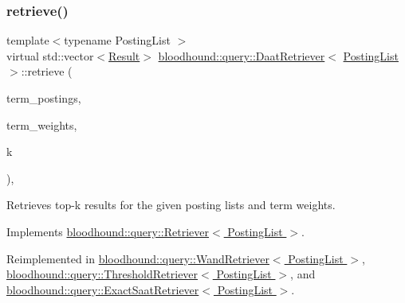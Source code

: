 \subsubsection{\texorpdfstring{retrieve()}{retrieve()}}
{\footnotesize\ttfamily template$<$typename Posting\+List $>$ \\
virtual std\+::vector$<$\hyperlink{structbloodhound_1_1query_1_1Result}{Result}$>$ \hyperlink{classbloodhound_1_1query_1_1DaatRetriever}{bloodhound\+::query\+::\+Daat\+Retriever}$<$ \hyperlink{classbloodhound_1_1PostingList}{Posting\+List} $>$\+::retrieve (\begin{DoxyParamCaption}\item[{const std\+::vector$<$ \hyperlink{classbloodhound_1_1PostingList}{Posting\+List} $>$ \&}]{term\+\_\+postings,  }\item[{const std\+::vector$<$ \hyperlink{structbloodhound_1_1Score}{Score} $>$ \&}]{term\+\_\+weights,  }\item[{std\+::size\+\_\+t}]{k }\end{DoxyParamCaption})\hspace{0.3cm}{\ttfamily [inline]}, {\ttfamily [virtual]}}



Retrieves top-\/k results for the given posting lists and term weights. 



Implements \hyperlink{classbloodhound_1_1query_1_1Retriever_ae3c6a4628c5580e620c213b3dcd47c2b}{bloodhound\+::query\+::\+Retriever$<$ Posting\+List $>$}.



Reimplemented in \hyperlink{classbloodhound_1_1query_1_1WandRetriever_a5f3068bc363c16c5b7255a925ea5af8c}{bloodhound\+::query\+::\+Wand\+Retriever$<$ Posting\+List $>$}, \hyperlink{classbloodhound_1_1query_1_1ThresholdRetriever_a06750450e1246e755ebad2d5dac6e8a8}{bloodhound\+::query\+::\+Threshold\+Retriever$<$ Posting\+List $>$}, and \hyperlink{classbloodhound_1_1query_1_1ExactSaatRetriever_aced2763cc2a4c12838fef4a20759049e}{bloodhound\+::query\+::\+Exact\+Saat\+Retriever$<$ Posting\+List $>$}.

\mbox{\label{classbloodhound_1_1query_1_1DaatRetriever_a5b10288f90a4fc4d89f56971bdc48363}} 
